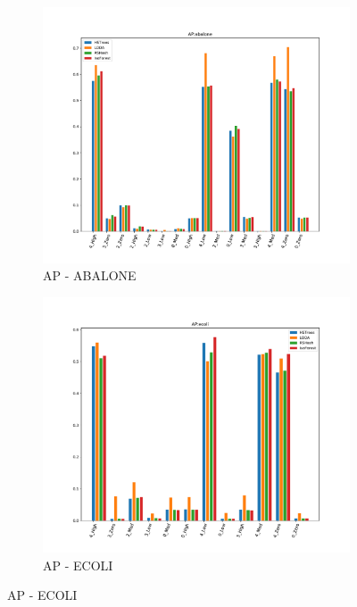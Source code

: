\begin{figure}[ht!]
    \centering
    \begin{subfigure}[t]{0.32\textwidth}
        \centering
        \includegraphics[width=\linewidth]{fig/baseline/AP_abalone.pdf}
        \caption{AP - ABALONE}
    \end{subfigure}
    \hfill
    \begin{subfigure}[t]{0.32\textwidth}
        \centering
        \includegraphics[width=\linewidth]{fig/baseline/AP_ecoli.pdf}
        \caption{AP - ECOLI}
    \end{subfigure}

\end{figure}
